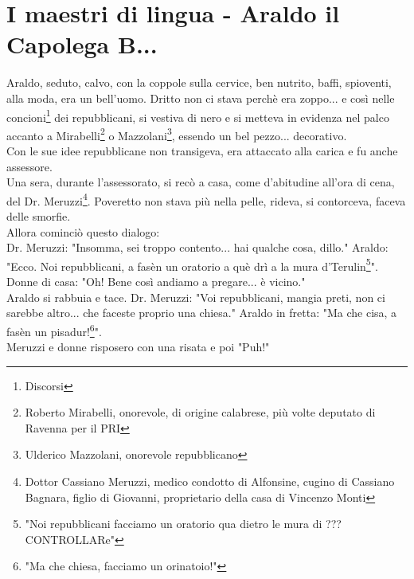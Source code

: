 \documentclass[10pt]{memoir} %
\begin{document}

\chapter{I maestri di lingua - Araldo il Capolega B...}
Araldo, seduto, calvo, con la coppole sulla cervice, ben nutrito, baffi, spioventi, alla moda, era un bell'uomo. Dritto non ci stava perchè era zoppo... e così nelle concioni\footnote{Discorsi} dei repubblicani, si vestiva di nero e si metteva in evidenza nel palco accanto a Mirabelli\footnote{Roberto Mirabelli, onorevole, di origine calabrese, più volte deputato di Ravenna per il PRI} o Mazzolani\footnote{Ulderico Mazzolani, onorevole repubblicano}, essendo un bel pezzo... decorativo.\\
Con le sue idee repubblicane non transigeva, era attaccato alla carica e fu anche assessore.\\
Una sera, durante l'assessorato, si recò a casa, come d'abitudine all'ora di cena, del Dr. Meruzzi\footnote{Dottor Cassiano Meruzzi, medico condotto di Alfonsine, cugino di Cassiano Bagnara, figlio di Giovanni, proprietario della casa di Vincenzo Monti}. Poveretto non stava più nella pelle, rideva, si contorceva, faceva delle smorfie.\\
Allora cominciò questo dialogo:\\
Dr. Meruzzi: "Insomma, sei troppo contento... hai qualche cosa, dillo."
Araldo: "Ecco. Noi repubblicani, a fasèn un oratorio a què drì a la mura d'Terulin\footnote{"Noi repubblicani facciamo un oratorio qua dietro le mura di ??? CONTROLLARe"}".\\
Donne di casa: "Oh! Bene così andiamo a pregare... è vicino."\\
Araldo si rabbuia e tace. 
Dr. Meruzzi: "Voi repubblicani, mangia preti, non ci sarebbe altro... che faceste proprio una chiesa."
Araldo in fretta: "Ma che cisa, a fasèn un pisadur!\footnote{"Ma che chiesa, facciamo un orinatoio!"}".\\
Meruzzi e donne risposero con una risata e poi "Puh!"\\
\end{document}
